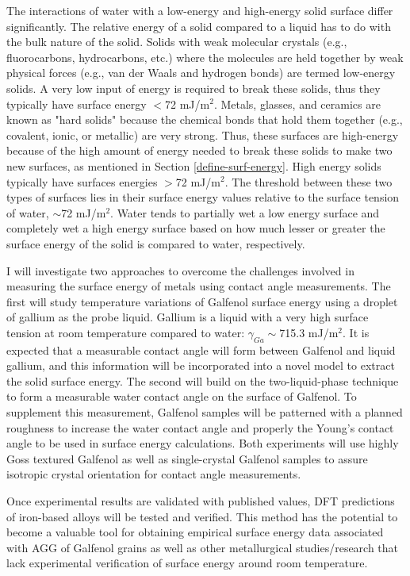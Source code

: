 
The interactions of water with a low-energy and high-energy solid surface differ significantly. The relative energy of a solid compared to a liquid has to do with the bulk nature of the solid. Solids with weak molecular crystals (e.g., fluorocarbons, hydrocarbons, etc.) where the molecules are held together by weak physical forces (e.g., van der Waals and hydrogen bonds) are termed low-energy solids. A very low input of energy is required to break these solids, thus they typically have surface energy $<$72 mJ/m$^2$.  Metals, glasses, and ceramics are known as "hard solids" because the chemical bonds that hold them together (e.g., covalent, ionic, or metallic) are very strong. Thus, these surfaces are high-energy because of the high amount of energy needed to break these solids to make two new surfaces, as mentioned in Section \ref{define-surf-energy}. High energy solids typically have surfaces energies $>$72 mJ/m$^2$.  The threshold between these two types of surfaces lies in their surface energy values relative to the surface tension of water, $\sim$72 mJ/m$^2$. Water tends to partially wet a low energy surface and completely wet a high energy surface based on how much lesser or greater the surface energy of the solid is compared to water, respectively. 

I will investigate two approaches to overcome the challenges involved in measuring the surface energy of metals using contact angle measurements. The first will study temperature variations of Galfenol surface energy using a droplet of gallium as the probe liquid. Gallium is a liquid with a very high surface tension at room temperature compared to water: $\gamma_{Ga}\sim$715.3 mJ/m$^2$. It is expected that a measurable contact angle will form between Galfenol and liquid gallium, and this information will be incorporated into a novel model to extract the solid surface energy. The second will build on the two-liquid-phase technique to form a measurable water contact angle on the surface of Galfenol. To supplement this measurement, Galfenol samples will be patterned with a planned roughness to increase the water contact angle and properly the Young's contact angle to be used in surface energy calculations. Both experiments will use highly Goss textured Galfenol as well as single-crystal Galfenol samples to assure isotropic crystal orientation for contact angle measurements. 

Once experimental results are validated with published values, DFT predictions of iron-based alloys will be tested and verified. This method has the potential to become a valuable tool for obtaining empirical surface energy data associated with AGG of Galfenol grains as well as other metallurgical studies/research that lack experimental verification of surface energy around room temperature. 


